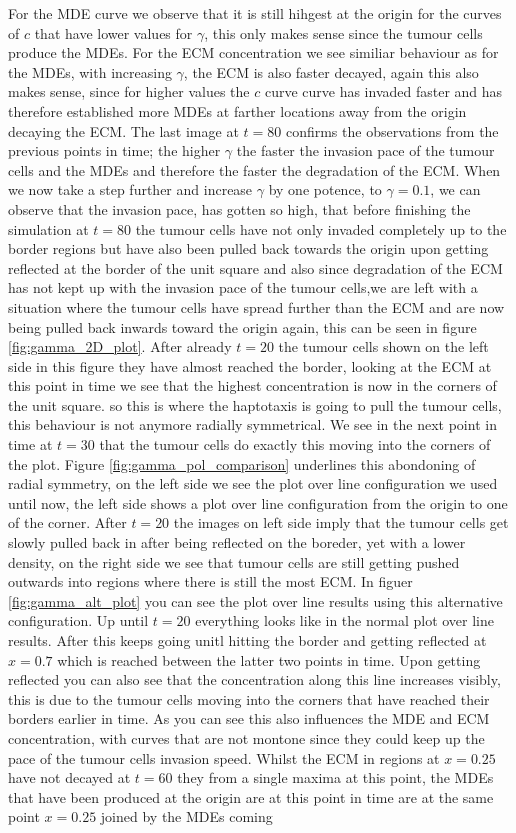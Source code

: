 For the MDE curve we observe that it is still hihgest at the origin for the curves of $c$ that have lower values for $\gamma$, this only makes sense since the tumour cells produce the MDEs. For the ECM concentration we see similiar behaviour as for the MDEs, with increasing $\gamma$, the ECM is also faster decayed, again this also makes sense, since for higher values the $c$ curve curve has invaded faster and has therefore established more MDEs at farther locations away from the origin decaying the ECM.
The last image at $t=80$ confirms the observations from the previous points in time; the higher $\gamma$ the faster the invasion pace of the tumour cells and the MDEs and therefore the faster the degradation of the ECM. 
When we now take a step further and increase $\gamma$ by one potence, to $\gamma=0.1$, we can observe that the invasion pace, has gotten so high, that before finishing the simulation at $t=80$ the tumour cells have not only invaded completely up to the border regions but have also been pulled back towards the origin upon getting reflected at the border of the unit square and also since degradation of the ECM has not kept up with the invasion pace of the tumour cells,we are left with a situation where the tumour cells have spread further than the ECM and are now being pulled back inwards toward the origin again, this can be seen in figure \ref{fig:gamma_2D_plot}. After already $t=20$ the tumour cells shown on the left side in this figure they have almost reached the border, looking at the ECM at this point in time we see that the highest concentration is now in the corners of the unit square. so this is where the haptotaxis is going to pull the tumour cells, this behaviour is not anymore radially symmetrical. We see in the next point in time at $t=30$ that the tumour cells do exactly this moving into the corners of the plot. Figure \ref{fig:gamma_pol_comparison} underlines this abondoning of radial symmetry, on the left side we see the plot over line configuration we used until now, the left side shows a plot over line configuration from the origin to one of the corner. After $t=20$ the images on left side imply that the tumour cells get slowly pulled back in after being reflected on the boreder, yet with a lower density, on the right side we see that tumour cells are still getting pushed outwards into regions where there is still the most ECM. In figuer \ref{fig:gamma_alt_plot} you can see the plot over line results using this alternative configuration. Up until $t=20$ everything looks like in the normal plot over line results. After this keeps going unitl hitting the border and getting reflected at $x=0.7$ which is reached between the latter two points in time. Upon getting reflected you can also see that the concentration along this line increases visibly, this is due to the tumour cells moving into the corners that have reached their borders earlier in time. As you can see this also influences the MDE and ECM concentration, with curves that are not montone since they could keep up the pace of the tumour cells invasion speed. Whilst the ECM in regions at $x=0.25$ have not decayed at $t=60$ they from a single maxima at this point, the MDEs that have been produced at the origin are at this point in time are at the same point $x=0.25$ joined by the MDEs coming 